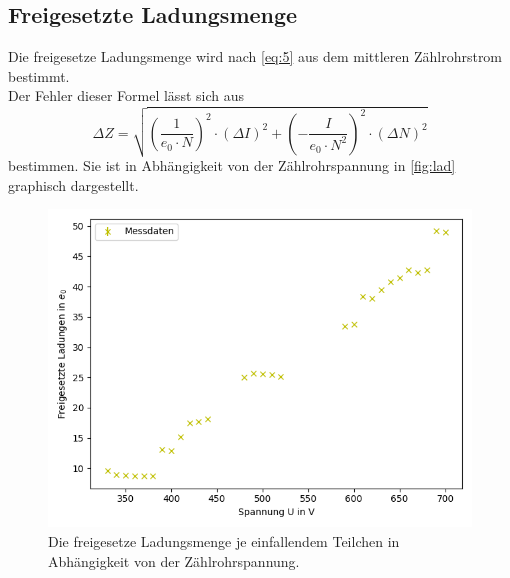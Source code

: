 \subsection{Freigesetzte Ladungsmenge}

Die freigesetze Ladungsmenge wird nach \autoref{eq:5} aus dem mittleren Zählrohrstrom
bestimmt.\\
Der Fehler dieser Formel lässt sich aus %
\begin{equation*}
  \Delta Z = \sqrt{ ( \frac{1}{e_0 \cdot N} )^2 \cdot (\Delta I)^2 + (- \frac{I}{e_0 \cdot N^2})^2 \cdot (\Delta N)^2}
\end{equation*}
bestimmen.
Sie ist in Abhängigkeit von der Zählrohrspannung in \autoref{fig:lad} graphisch dargestellt.\\
\begin{figure}[H]
  \centering
  \includegraphics{content/figure_2.png}
  \caption{Die freigesetze Ladungsmenge je einfallendem Teilchen in Abhängigkeit von der Zählrohrspannung.}
  \label{fig:lad}
\end{figure}



